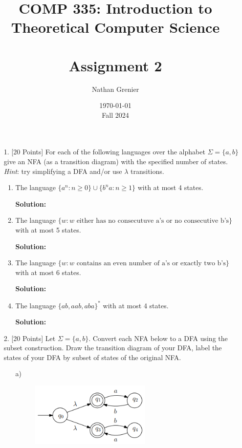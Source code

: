 \documentclass[12pt]{article}
\title{COMP 335: Introduction to Theoretical Computer Science\\
\ \\
Assignment 2}
\author{Nathan Grenier}
\date{\today \\ Fall 2024}
\begin{document}
\begin{spacing}{1.5}
    \maketitle

    \newpage

    \begin{enumerate}

        \item[1.] [20 Points] For each of the following languages over the alphabet $\Sigma = \{a,b\}$ give an NFA (as a transition diagram) with the specified number of states. \emph{Hint}: try simplifying a DFA and/or use $\lambda$ transitions.

              \begin{enumerate}
                  \item The language $\{a^n : n \geq 0 \} \cup \{b^na : n \geq 1 \}$ with at most 4 states.

                        \textbf{Solution:}

                  \item The language $\{w : w \text{ either has no consecutuve a's or no consecutive b's} \}$ with at most 5 states.

                        \textbf{Solution:}

                  \item The language $\{w : w \text{ contains an even number of a's or exactly two b's} \}$ with at most 6 states.

                        \textbf{Solution:}

                  \item The language $\{ab,aab,aba \}^*$ with at most 4 states.

                        \textbf{Solution:}

              \end{enumerate}

              \newpage
        \item[2.] [20 Points] Let $\Sigma = \{a,b \}$. Convert each NFA below to a DFA using the subset construction. Draw the transition diagram of your DFA, label the states of your DFA by subset of states of the original NFA.

              \begin{enumerate}
                  \item[] a)
                        \begin{figure}[h!]
                            \centering
                            \includegraphics[width=0.6\textwidth]{img/q2/q2a.png}
                        \end{figure}


\end{enumerate}
\end{enumerate}
\end{spacing}
\end{document}
